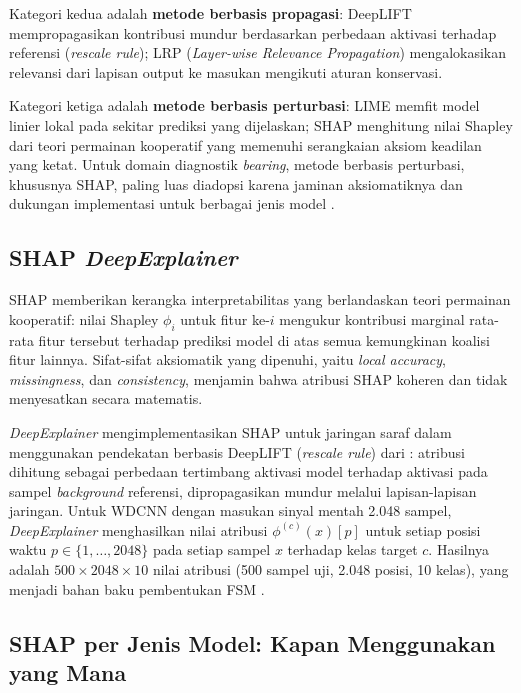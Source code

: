 Kategori kedua adalah \textbf{metode berbasis propagasi}: DeepLIFT
 mempropagasikan kontribusi mundur berdasarkan
perbedaan aktivasi terhadap referensi (\emph{rescale rule}); LRP
(\emph{Layer-wise Relevance Propagation}) mengalokasikan relevansi dari lapisan
output ke masukan mengikuti aturan konservasi.

Kategori ketiga adalah \textbf{metode berbasis perturbasi}: LIME
 memfit model linier lokal pada sekitar prediksi
yang dijelaskan; SHAP  menghitung nilai Shapley
dari teori permainan kooperatif yang memenuhi serangkaian aksiom keadilan
yang ketat. Untuk domain diagnostik \emph{bearing}, metode berbasis perturbasi, khususnya SHAP,
paling luas diadopsi karena jaminan aksiomatiknya dan dukungan implementasi
untuk berbagai jenis model .

\subsection{SHAP \emph{DeepExplainer}}
\label{subsec:bab2_shap_deep}

SHAP  memberikan kerangka interpretabilitas yang
berlandaskan teori permainan kooperatif: nilai Shapley $\phi_i$ untuk fitur
ke-$i$ mengukur kontribusi marginal rata-rata fitur tersebut terhadap prediksi
model di atas semua kemungkinan koalisi fitur lainnya. Sifat-sifat aksiomatik
yang dipenuhi, yaitu \emph{local accuracy}, \emph{missingness}, dan
\emph{consistency}, menjamin bahwa atribusi SHAP koheren dan tidak
menyesatkan secara matematis.

\emph{DeepExplainer} mengimplementasikan SHAP untuk jaringan saraf dalam
menggunakan pendekatan berbasis DeepLIFT (\emph{rescale rule}) dari
: atribusi dihitung sebagai perbedaan
tertimbang aktivasi model terhadap aktivasi pada sampel \emph{background}
referensi, dipropagasikan mundur melalui lapisan-lapisan jaringan. Untuk
WDCNN dengan masukan sinyal mentah 2.048 sampel, \emph{DeepExplainer}
menghasilkan nilai atribusi $\phi^{(c)}(x)[p]$ untuk setiap posisi waktu
$p \in \{1, \ldots, 2048\}$ pada setiap sampel $x$ terhadap kelas target $c$.
Hasilnya adalah $500 \times 2048 \times 10$ nilai atribusi (500 sampel uji,
2.048 posisi, 10 kelas), yang menjadi bahan baku pembentukan FSM
.

\subsection{SHAP per Jenis Model: Kapan Menggunakan yang Mana}
\label{subsec:bab2_shap_per_jenis}

